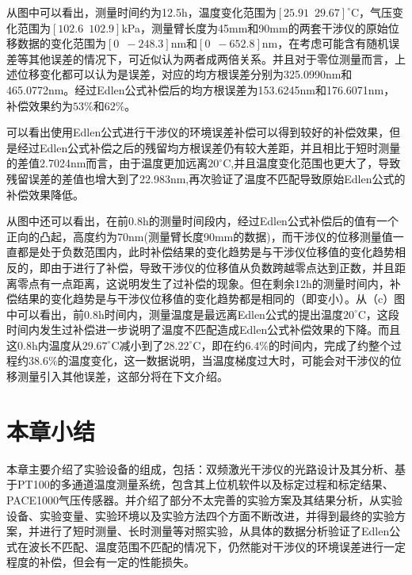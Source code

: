 从图中可以看出，测量时间约为12.5h，温度变化范围为$[25.91\,\,\,29.67]^{\circ} \mathrm{C}$，气压变化范围为$[102.6\,\,\,102.9]$kPa，测量臂长度为45mm和90mm的两套干涉仪的原始位移数据的变化范围为$[0 \,\,\, -248.3]$nm和$[0\,\,\,-652.8]$nm，在考虑可能含有随机误差等其他误差的情况下，可近似认为两者成两倍关系。并且对于零位测量而言，上述位移变化都可以认为是误差，对应的均方根误差分别为325.0990nm和465.0772nm。经过Edlen公式补偿后的均方根误差为153.6245nm和176.6071nm，补偿效果约为$53\%$和$62\%$。

可以看出使用Edlen公式进行干涉仪的环境误差补偿可以得到较好的补偿效果，但是经过Edlen公式补偿之后的残留均方根误差仍有较大差距，并且相比于短时测量的差值2.7024nm而言，由于温度更加远离$20^{\circ} \mathrm{C}$,并且温度变化范围也更大了，导致残留误差的差值也增大到了22.983nm,再次验证了温度不匹配导致原始Edlen公式的补偿效果降低。

从图中还可以看出，在前0.8h的测量时间段内，经过Edlen公式补偿后的值有一个正向的凸起，高度约为70nm(测量臂长度90mm的数据)，而干涉仪的位移测量值一直都是处于负数范围内，此时补偿结果的变化趋势是与干涉仪位移值的变化趋势相反的，即由于进行了补偿，导致干涉仪的位移值从负数跨越零点达到正数，并且距离零点有一点距离，这说明发生了过补偿的现象。但在剩余12h的测量时间内，补偿结果的变化趋势是与干涉仪位移值的变化趋势都是相同的（即变小）。从（c）图中可以看出，前0.8h时间内，测量温度是最远离Edlen公式的提出温度$20^{\circ} \mathrm{C}$，这段时间内发生过补偿进一步说明了温度不匹配造成Edlen公式补偿效果的下降。而且这0.8h内温度从$29.67^{\circ} \mathrm{C}$减小到了$28.22^{\circ} \mathrm{C}$，即在约$6.4\%$的时间内，完成了约整个过程约$38.6\%$的温度变化，这一数据说明，当温度梯度过大时，可能会对干涉仪的位移测量引入其他误差，这部分将在下文介绍。

\section{本章小结}
本章主要介绍了实验设备的组成，包括：双频激光干涉仪的光路设计及其分析、基于PT100的多通道温度测量系统，包含其上位机软件以及标定过程和标定结果、PACE1000气压传感器。并介绍了部分不太完善的实验方案及其结果分析，从实验设备、实验变量、实验环境以及实验方法四个方面不断改进，并得到最终的实验方案，并进行了短时测量、长时测量等对照实验，从具体的数据分析验证了Edlen公式在波长不匹配、温度范围不匹配的情况下，仍然能对干涉仪的环境误差进行一定程度的补偿，但会有一定的性能损失。